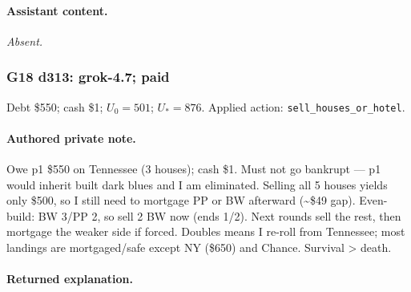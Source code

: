 \paragraph{Assistant content.}

\textit{Absent.}

\medskip

\subsubsection*{G18 d313: grok-4.7; paid}

Debt \$550; cash \$1; $U_0=501$; $U_*=876$. Applied action: \texttt{sell\_houses\_or\_hotel}.

\paragraph{Authored private note.}

{\small Owe p1 \$550 on Tennessee (3 houses); cash \$1. Must not go bankrupt — p1 would inherit built dark blues and I am eliminated. Selling all 5 houses yields only \$500, so I still need to mortgage PP or BW afterward (\textasciitilde{}\$49 gap). Even-build: BW 3/PP 2, so sell 2 BW now (ends 1/2). Next rounds sell the rest, then mortgage the weaker side if forced. Doubles means I re-roll from Tennessee; most landings are mortgaged/safe except NY (\$650) and Chance. Survival > death.\par}

\paragraph{Returned explanation.}

